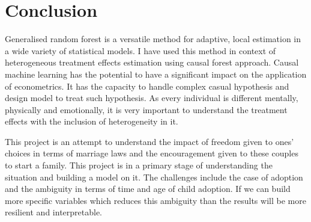 \documentclass[11pt, a4paper, leqno]{article}
\begin{document}
\section{Conclusion} %
\label{sec:Conclusion}

Generalised random forest is a versatile method for adaptive, local estimation in a wide variety of statistical models. I have used this method
in context of heterogeneous treatment effects estimation using causal forest approach. Causal machine learning has the potential to have a
significant impact on the application of econometrics. It has the capacity to handle complex casual hypothesis and design model to treat such
hypothesis. As every individual is different mentally, physically and emotionally, it is very important to understand the treatment effects with
the inclusion of heterogeneity in it.

This project is an attempt to understand the impact of freedom given to ones' choices in terms of marriage laws and the encouragement given to
these couples to start a family. This project is in a primary stage of understanding the situation and building a model on it. The challenges
include the case of adoption and the ambiguity in terms of time and age of child adoption. If we can build more specific variables which reduces
this ambiguity than the results will be more resilient and interpretable.


\nocite{*}
\printbibliography
{}



\end{document}
